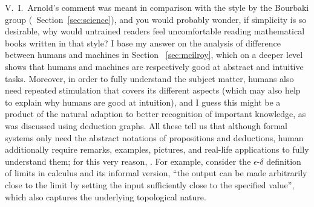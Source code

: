 V.~I.\ Arnold's comment was meant in comparison with the style by
the Bourbaki group (\cf~Section~\ref{sec:science}), and you would probably
wonder, if simplicity is so desirable, why would untrained readers feel
uncomfortable reading mathematical books written in that style?  I base my
answer on the analysis of difference between humans and machines in Section~%
\ref{sec:mcilroy}, which on a deeper level shows that humans and machines are
respectively good at abstract and intuitive tasks.  Moreover, in order to fully
understand the subject matter, humans also need repeated stimulation that covers
its different aspects (which may also help to explain why humans are good at
intuition), and I guess this might be a product of the natural adaption to
better recognition of important knowledge, as was discussed using deduction
graphs.  All these tell us that although formal systems only need the abstract
notations of propositions and deductions, human additionally require remarks,
examples, pictures, and real-life applications to fully understand them;
for this very reason, .  For example,
consider the $\epsilon$-$\delta$ definition of limits in calculus and
its informal version, ``the output can be made arbitrarily close to
the limit by setting the input sufficiently close to the specified
value'', which also captures the underlying topological nature.

